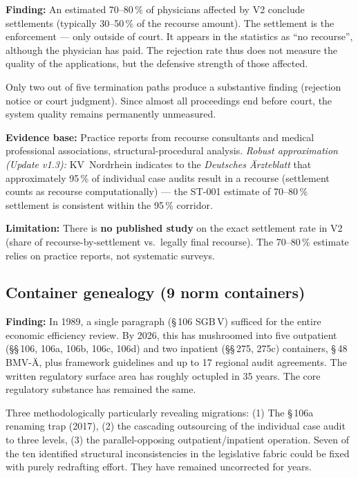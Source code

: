\documentclass{umbruch-position}
\begin{document}
\textbf{Finding:} An estimated 70--80\,\% of physicians affected by V2 conclude settlements (typically 30--50\,\% of the recourse amount). The settlement is the enforcement --- only outside of court. It appears in the statistics as ``no recourse'', although the physician has paid. The rejection rate thus does not measure the quality of the applications, but the defensive strength of those affected.

Only two out of five termination paths produce a substantive finding (rejection notice or court judgment). Since almost all proceedings end before court, the system quality remains permanently unmeasured.

\textbf{Evidence base:} Practice reports from recourse consultants and medical professional associations, structural-procedural analysis. \emph{Robust approximation (Update v1.3):} KV~Nordrhein indicates to the \emph{Deutsches \"Arzteblatt} that approximately 95\,\% of individual case audits result in a recourse (settlement counts as recourse computationally) --- the ST-001 estimate of 70--80\,\% settlement is consistent within the 95\,\% corridor.

\textbf{Limitation:} There is \textbf{no published study} on the exact settlement rate in V2 (share of recourse-by-settlement vs.\ legally final recourse). The 70--80\,\% estimate relies on practice reports, not systematic surveys.

\subsection{Container genealogy (9 norm containers)}

\textbf{Finding:} In 1989, a single paragraph (\S\,106 SGB\,V) sufficed for the entire economic efficiency review. By 2026, this has mushroomed into five outpatient (\S\S\,106, 106a, 106b, 106c, 106d) and two inpatient (\S\S\,275, 275c) containers, \S\,48 BMV-\"A, plus framework guidelines and up to 17 regional audit agreements. The written regulatory surface area has roughly octupled in 35 years. The core regulatory substance has remained the same.

Three methodologically particularly revealing migrations: (1) The \S\,106a renaming trap (2017), (2) the cascading outsourcing of the individual case audit to three levels, (3) the parallel-opposing outpatient/inpatient operation. Seven of the ten identified structural inconsistencies in the legislative fabric could be fixed with purely redrafting effort. They have remained uncorrected for years.
\end{document}

